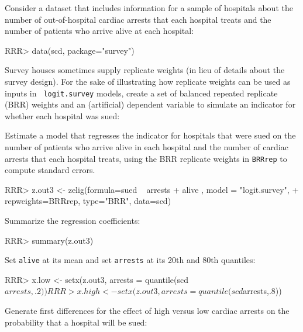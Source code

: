 \begin{enumerate}
Consider a dataset that includes information for a sample of hospitals
about the number of out-of-hospital cardiac arrests that each
hospital treats and the number of patients who arrive alive
at each hospital: 
\begin{Schunk}
\begin{Sinput}
RRR> data(scd, package="survey") 
\end{Sinput}
\end{Schunk}
Survey houses sometimes supply
replicate weights (in lieu of details about the survey design).  For the sake
of illustrating how replicate weights can be used as inputs in {\tt
logit.survey} models, create a set of balanced repeated replicate
(BRR) weights and an (artificial) dependent variable to simulate an indicator 
for whether each hospital was sued:
\begin{Schunk}
\end{Schunk}
Estimate a model that regresses the indicator for hospitals that were
sued on the number of patients who arrive alive in
each hospital and the number of cardiac arrests that each hospital treats, using
the BRR replicate weights in {\tt BRRrep} to compute standard errors.
\begin{Schunk}
\begin{Sinput}
RRR> z.out3 <- zelig(formula=sued ~ arrests + alive , model = "logit.survey", 
+   repweights=BRRrep, type="BRR", data=scd)
\end{Sinput}
\end{Schunk}
Summarize the regression coefficients: 
\begin{Schunk}
\begin{Sinput}
RRR>  summary(z.out3)
\end{Sinput}
\end{Schunk}
Set {\tt alive} at its mean and set {\tt arrests} at its 20th and 80th quantiles:
\begin{Schunk}
\begin{Sinput}
RRR> x.low <- setx(z.out3, arrests = quantile(scd$arrests, .2))
RRR> x.high <- setx(z.out3, arrests = quantile(scd$arrests,.8)) 
\end{Sinput}
\end{Schunk}
Generate first
differences for the effect of high versus low cardiac arrests
on the probability that a hospital will be sued:

\end{enumerate}
